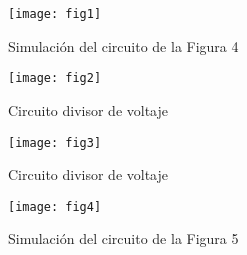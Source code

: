 \documentclass[a4paper,12pt]{article}
\begin{document}
\begin{figure}[!h]
\centering
	\texttt{[image: fig1]}
	\label{fig6}
	 \caption{Simulación del circuito de la Figura 4}
\end{figure}



\begin{figure}[!h]
\centering
	\texttt{[image: fig2]}
	\label{fig7}
	\caption{Circuito divisor de voltaje}
\end{figure}


\begin{figure}[!h]
\centering
	\texttt{[image: fig3]}
	\label{fig8}
	\caption{Circuito divisor de voltaje}
\end{figure}


\begin{figure}[!h]
\centering
	\texttt{[image: fig4]}
	\label{fig9}
	 \caption{Simulación del circuito de la Figura 5}
\end{figure}
\end{document}
